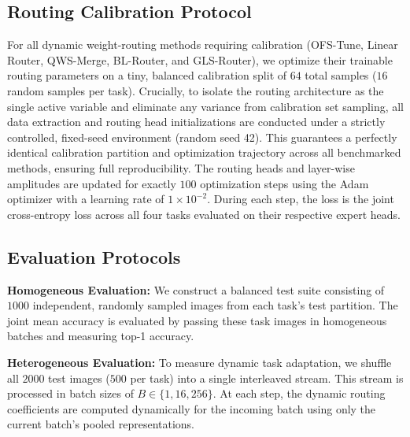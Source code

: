 \documentclass{article}
\theoremstyle{plain}
\theoremstyle{definition}
\theoremstyle{remark}
\begin{document}
\subsection{Routing Calibration Protocol}
For all dynamic weight-routing methods requiring calibration (OFS-Tune, Linear Router, QWS-Merge, BL-Router, and GLS-Router), we optimize their trainable routing parameters on a tiny, balanced calibration split of $64$ total samples ($16$ random samples per task). Crucially, to isolate the routing architecture as the single active variable and eliminate any variance from calibration set sampling, all data extraction and routing head initializations are conducted under a strictly controlled, fixed-seed environment (random seed 42). This guarantees a perfectly identical calibration partition and optimization trajectory across all benchmarked methods, ensuring full reproducibility.
The routing heads and layer-wise amplitudes are updated for exactly $100$ optimization steps using the Adam optimizer with a learning rate of $1\times 10^{-2}$. During each step, the loss is the joint cross-entropy loss across all four tasks evaluated on their respective expert heads.

\subsection{Evaluation Protocols}
\textbf{Homogeneous Evaluation:} We construct a balanced test suite consisting of $1000$ independent, randomly sampled images from each task's test partition. The joint mean accuracy is evaluated by passing these task images in homogeneous batches and measuring top-1 accuracy.

\textbf{Heterogeneous Evaluation:} To measure dynamic task adaptation, we shuffle all $2000$ test images ($500$ per task) into a single interleaved stream. This stream is processed in batch sizes of $B \in \{1, 16, 256\}$. At each step, the dynamic routing coefficients are computed dynamically for the incoming batch using only the current batch's pooled representations.
\end{document}
